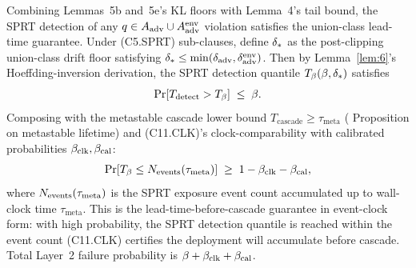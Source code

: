 \addtocounter{lemma}{-1}\renewcommand{\thelemma}{5d}
\begin{lemma}
\label{lem:5d}
Combining Lemmas~5b and~5e's KL floors with Lemma~4's tail bound,
the SPRT detection of any $q \in A_{\mathrm{adv}} \cup A_{\mathrm{adv}}^{\mathrm{env}}$
violation satisfies the union-class lead-time guarantee.  Under
(C5.SPRT) sub-clauses, define $\delta_{*}$ as the post-clipping
union-class drift floor satisfying $\delta_{*} \leq \min(\delta_{\mathrm{adv}},
\delta_{\mathrm{adv}}^{\mathrm{env}})$.  Then by Lemma~\ref{lem:6}'s
Hoeffding-inversion derivation, the SPRT detection quantile
$T_{\beta}(\beta, \delta_{*})$ satisfies
\[
  \Pr[T_{\mathrm{detect}} > T_{\beta}] \;\leq\; \beta.
\]
Composing with the metastable cascade lower bound
$T_{\mathrm{cascade}} \geq \tau_{\mathrm{meta}}$
(\citep[Phase~Redundancy]{lasser2026phase} Proposition on metastable
lifetime) and (C11.CLK)'s clock-comparability with calibrated
probabilities $\beta_{\mathrm{clk}}, \beta_{\mathrm{cal}}$:
\[
  \Pr[T_{\beta} \leq N_{\mathrm{events}}(\tau_{\mathrm{meta}})] \;\geq\; 1 - \beta_{\mathrm{clk}} -
  \beta_{\mathrm{cal}},
\]
where $N_{\mathrm{events}}(\tau_{\mathrm{meta}})$ is the SPRT exposure event count
accumulated up to wall-clock time $\tau_{\mathrm{meta}}$.  This is
the lead-time-before-cascade guarantee in event-clock form: with
high probability, the SPRT detection quantile is reached within
the event count (C11.CLK) certifies the deployment will accumulate
before cascade.  Total Layer~2 failure probability is $\beta +
\beta_{\mathrm{clk}} + \beta_{\mathrm{cal}}$.
\end{lemma}

